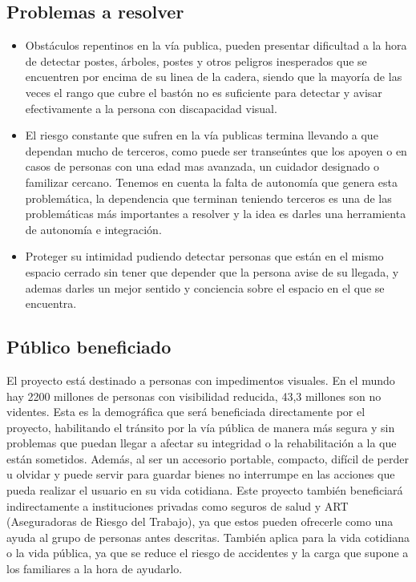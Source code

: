 \documentclass[12pt,a4paper]{article}
\begin{document}
\subsection{Problemas a resolver}

\begin{itemize}
\item Obstáculos repentinos en la vía publica, pueden presentar dificultad a la hora de detectar postes, árboles, postes y otros peligros inesperados que se encuentren por encima de su linea de la cadera, siendo que la mayoría de las veces el rango que cubre el bastón no es suficiente para detectar y avisar efectivamente a la persona con discapacidad visual.
\item El riesgo constante que sufren en la vía publicas termina llevando a que dependan mucho de terceros, como puede ser transeúntes que los apoyen o en casos de personas con una edad mas avanzada, un cuidador designado o familizar cercano. Tenemos en cuenta la falta de autonomía que genera esta problemática, la dependencia que terminan teniendo terceros es una de las problemáticas más importantes a resolver y la idea es darles una herramienta de autonomía e integración.
\item Proteger su intimidad pudiendo detectar personas que están en el mismo espacio cerrado sin tener que depender que la persona avise de su llegada, y ademas darles un mejor sentido y conciencia sobre el espacio en el que se encuentra. 
\end{itemize}

\subsection{Público beneficiado}
El proyecto está destinado a personas con impedimentos visuales. En el mundo hay 2200 millones de personas con visibilidad reducida, 43,3 millones son no videntes. Esta es la demográfica que será beneficiada directamente por el proyecto, habilitando el tránsito por la vía pública de manera más segura y sin problemas que puedan llegar a afectar su integridad o la rehabilitación a la que están sometidos. Además, al ser un accesorio portable, compacto, difícil de perder u olvidar y puede servir para guardar bienes no interrumpe en las acciones que pueda realizar el usuario en su vida cotidiana. Este proyecto también beneficiará indirectamente a instituciones privadas como seguros de salud y ART (Aseguradoras de Riesgo del Trabajo), ya que estos pueden ofrecerle como una ayuda al grupo de personas antes descritas. También aplica para la vida cotidiana o la vida pública, ya que se reduce el riesgo de accidentes y la carga que supone a los familiares a la hora de ayudarlo.
\end{document}
